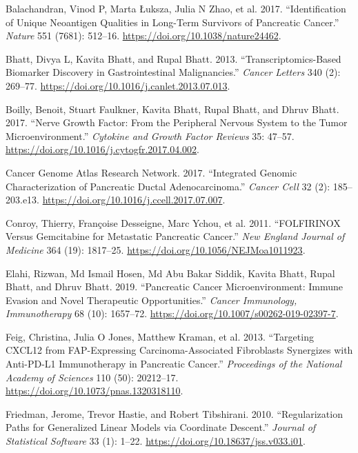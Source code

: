 \documentclass[
  12pt,
]{article}
\newlength{\cslhangindent}
\newenvironment{CSLReferences}[2] %
 {\begin{list}{}{%
  \setlength{\itemindent}{0pt}
  \setlength{\leftmargin}{0pt}
  \setlength{\parsep}{0pt}
  \ifodd #1
   \setlength{\leftmargin}{\cslhangindent}
   \setlength{\itemindent}{-1\cslhangindent}
  \fi
  \setlength{\itemsep}{#2\baselineskip}}}
 {\end{list}}
\begin{document}
\protect{}\label{refs}
\begin{CSLReferences}{1}{1}
Balachandran, Vinod P, Marta Łuksza, Julia N Zhao, et al. 2017.
{``Identification of Unique Neoantigen Qualities in Long-Term Survivors
of Pancreatic Cancer.''} \emph{Nature} 551 (7681): 512--16.
\url{https://doi.org/10.1038/nature24462}.

Bhatt, Divya L, Kavita Bhatt, and Rupal Bhatt. 2013.
{``Transcriptomics-Based Biomarker Discovery in Gastrointestinal
Malignancies.''} \emph{Cancer Letters} 340 (2): 269--77.
\url{https://doi.org/10.1016/j.canlet.2013.07.013}.

Boilly, Benoit, Stuart Faulkner, Kavita Bhatt, Rupal Bhatt, and Dhruv
Bhatt. 2017. {``Nerve Growth Factor: {From} the Peripheral Nervous
System to the Tumor Microenvironment.''} \emph{Cytokine and Growth
Factor Reviews} 35: 47--57.
\url{https://doi.org/10.1016/j.cytogfr.2017.04.002}.

Cancer Genome Atlas Research Network. 2017. {``Integrated Genomic
Characterization of Pancreatic Ductal Adenocarcinoma.''} \emph{Cancer
Cell} 32 (2): 185--203.e13.
\url{https://doi.org/10.1016/j.ccell.2017.07.007}.

Conroy, Thierry, Françoise Desseigne, Marc Ychou, et al. 2011.
{``{FOLFIRINOX} Versus Gemcitabine for Metastatic Pancreatic Cancer.''}
\emph{New England Journal of Medicine} 364 (19): 1817--25.
\url{https://doi.org/10.1056/NEJMoa1011923}.

Elahi, Rizwan, Md Ismail Hosen, Md Abu Bakar Siddik, Kavita Bhatt, Rupal
Bhatt, and Dhruv Bhatt. 2019. {``Pancreatic Cancer Microenvironment:
Immune Evasion and Novel Therapeutic Opportunities.''} \emph{Cancer
Immunology, Immunotherapy} 68 (10): 1657--72.
\url{https://doi.org/10.1007/s00262-019-02397-7}.

Feig, Christina, Julia O Jones, Matthew Kraman, et al. 2013.
{``Targeting {CXCL12} from {FAP}-Expressing Carcinoma-Associated
Fibroblasts Synergizes with Anti-{PD-L1} Immunotherapy in Pancreatic
Cancer.''} \emph{Proceedings of the National Academy of Sciences} 110
(50): 20212--17. \url{https://doi.org/10.1073/pnas.1320318110}.

Friedman, Jerome, Trevor Hastie, and Robert Tibshirani. 2010.
{``Regularization Paths for Generalized Linear Models via Coordinate
Descent.''} \emph{Journal of Statistical Software} 33 (1): 1--22.
\url{https://doi.org/10.18637/jss.v033.i01}.


\end{CSLReferences}
\end{document}
